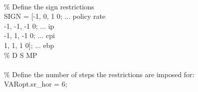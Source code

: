 \hspace{1mm}\hspace{5mm} \hspace{5mm}  \\ 
\hspace{1mm}\hspace{5mm} \hspace{5mm} \textcolor{matlabgreen}{\% Define the sign restrictions }\\ 
\hspace{1mm}\hspace{5mm} \hspace{5mm} SIGN = [-1,       0,       1      0;        ... policy rate \\ 
\hspace{1mm}\hspace{5mm} \hspace{5mm} -1,      -1,      -1      0;        ... ip         \\ 
\hspace{1mm}\hspace{5mm} \hspace{5mm} -1,       1,      -1      0;        ... cpi \\ 
\hspace{1mm}\hspace{5mm} \hspace{5mm} 1,       1,       1      0];       ... ebp \\ 
\hspace{1mm}\hspace{5mm} \hspace{5mm} \textcolor{matlabgreen}{\% D        S        MP        }\\ 
\hspace{1mm}\hspace{5mm} \hspace{5mm}  \\ 
\hspace{1mm}\hspace{5mm} \hspace{5mm} \textcolor{matlabgreen}{\% Define the number of steps the restrictions are imposed for: }\\ 
\hspace{1mm}\hspace{5mm} \hspace{5mm} VARopt.sr\_hor = 6; \\ 
\hspace{1mm}\hspace{5mm} \hspace{5mm}  \\ 
